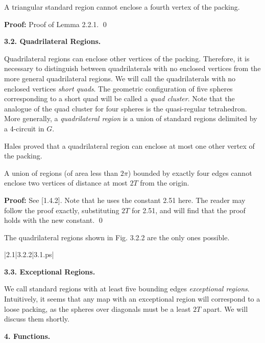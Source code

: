  A triangular standard region cannot enclose a fourth 
vertex of the packing. \endproclaim

{\bf Proof:} Proof of Lemma 2.2.1. \qed

\bigskip

{\bf 3.2. Quadrilateral Regions.}

\bigskip

Quadrilateral regions can enclose other vertices of the packing.  Therefore, it is 
necessary to distinguish between quadrilaterals with no enclosed vertices from
the more general quadrilateral regions.  We will call the quadrilaterals
with no enclosed vertices {\it short quads}.  The geometric configuration of five spheres
corresponding to a short quad will be called a {\it quad cluster}.  
Note that the analogue of the quad cluster for four spheres 
is the quasi-regular tetrahedron.  More generally, a {\it quadrilateral region}
 is a union of standard regions delimited by a 4-circuit in $G$.  

Hales proved that a quadrilateral region can enclose at most one other vertex of the packing.


 A union of regions (of area less than $2\pi$) 
bounded by exactly four edges cannot enclose two vertices of distance at 
most $2T$ from the origin.  \endproclaim

{\bf Proof:} See [1.4.2].  Note that he uses the constant 2.51 here. 
 The reader may follow the proof exactly, substituting $2T$ for 2.51, and will 
find that the proof holds with the new constant. \qed

\bigskip

 The quadrilateral regions shown in Fig. 3.2.2 are the only ones
 possible.  \endproclaim


\gram|2.1|3.2.2|3.1.ps|  %


\bigskip

{\bf 3.3. Exceptional Regions.}

\bigskip

We call standard regions with at least five bounding edges {\it exceptional regions}.  
Intuitively, it seems that any map with an exceptional region will correspond
to a loose packing, as the spheres over diagonals must be a least $2T$ apart.  
We will
discuss them shortly.

\bigskip

\centerline{{\bf 4. Functions.}}

